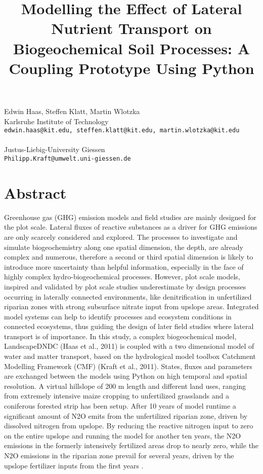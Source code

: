 \title{Modelling the Effect of Lateral Nutrient Transport on Biogeochemical Soil Processes: A Coupling Prototype Using Python}
 \author{} \institute{}
\maketitle
\begin{center}
{\large Edwin  Haas, Steffen Klatt, Martin Wlotzka}\\
Karlsruhe Institute of Technology\\
{\tt edwin.haas@kit.edu, steffen.klatt@kit.edu, martin.wlotzka@kit.edu}
\\ \vspace{4mm}{\large Philipp Kraft}\\
Justus-Liebig-University Giessen\\
{\tt Philipp.Kraft@umwelt.uni-giessen.de}

\end{center}

\section*{Abstract}

Greenhouse gas (GHG) emission models and field studies are mainly designed for the plot scale. Lateral fluxes of reactive substances as a driver for GHG emissions are only scarcely considered and explored. The processes to investigate and simulate biogeochemistry along one spatial dimension, the depth, are already complex and numerous, therefore a second or third spatial dimension is likely to introduce more uncertainty than helpful information, especially in the face of highly complex hydro-biogeochemical processes. However, plot scale models, inspired and validated by plot scale studies underestimate by design processes occurring in laterally connected environments, like denitrification in unfertilized riparian zones with strong subsurface nitrate input from upslope areas. Integrated model systems can help to identify processes and ecosystem conditions in connected ecosystems, thus guiding the design of later field studies where lateral transport is of importance.
In this study, a complex biogeochemical model, LandscapeDNDC (Haas et al., 2011) is coupled with a two dimensional model of water and matter transport, based on the hydrological model toolbox Catchment Modelling Framework (CMF) (Kraft et al., 2011). States, fluxes and parameters are exchanged between the models using Python on high temporal and spatial resolution. A virtual hillslope of 200 m length and different land uses, ranging from extremely intensive maize cropping to unfertilized grasslands and a coniferous forested strip has been setup. After 10 years of model runtime a significant amount of N2O emits from the unfertilized riparian zone, driven by dissolved nitrogen from upslope. By reducing the reactive nitrogen input to zero on the entire upslope and running the model for another ten years, the N2O emissions in the formerly intensively fertilized areas drop to nearly zero, while the N2O emissions in the riparian zone prevail for several years, driven by the upslope fertilizer inputs from the first years . 

